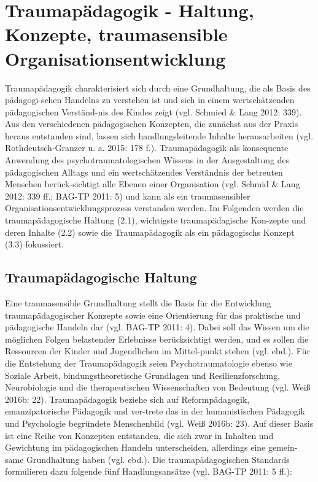 \section{Traumap{\"a}dagogik - Haltung, Konzepte, traumasensible Organisationsentwicklung}

Traumapädagogik charakterisiert sich durch eine Grundhaltung, die als Basis des pädagogi-schen Handelns zu verstehen ist und sich in einem wertschätzenden pädagogischen Verständ-nis des Kindes zeigt (vgl. Schmied \& Lang 2012: 339). Aus den verschiedenen pädagogischen Konzepten, die zunächst aus der Praxis heraus entstanden sind, lassen sich handlungsleitende Inhalte herausarbeiten (vgl. Rothdeutsch-Granzer u. a. 2015: 178 f.). Traumapädagogik als konsequente Anwendung des psychotraumatologischen Wissens in der Ausgestaltung des pädagogischen Alltags und ein wertschätzendes Verständnis der betreuten Menschen berück-sichtigt alle Ebenen einer Organisation (vgl. Schmid \& Lang 2012: 339 ff.; BAG-TP 2011: 5) und kann als ein traumasensibler Organisationsentwicklungsprozess verstanden werden. Im Folgenden werden die traumapädagogische Haltung (2.1), wichtigste traumapädagische Kon-zepte und deren Inhalte (2.2) sowie die Traumap{\"a}dagogik als ein pädagogischs Konzept (3.3) fokussiert.

\subsection{Traumapädagogische Haltung}

Eine traumasensible Grundhaltung stellt die Basis für die Entwicklung traumapädagogischer Konzepte sowie eine Orientierung für das praktische und pädagogische Handeln dar (vgl. BAG-TP 2011: 4). Dabei soll das Wissen um die möglichen Folgen belastender Erlebnisse berücksichtigt werden, und es sollen die Ressourcen der Kinder und Jugendlichen im Mittel-punkt stehen (vgl. ebd.). Für die Entstehung der Traumap{\"a}dagogik seien Psychotraumatologie ebenso wie Soziale Arbeit, bindungstheoretische Grundlagen und Resilienzforschung, Neurobiologie und die therapeutischen Wissenschaften von Bedeutung (vgl. Weiß 2016b: 22). Traumap{\"a}dagogik beziehe sich auf Reformpädagogik, emanzipatorische Pädagogik und ver-trete das in der humanistischen Pädagogik und Psychologie begründete Menschenbild (vgl. Weiß 2016b: 23). Auf dieser Basis ist eine Reihe von Konzepten entstanden, die sich zwar in Inhalten und Gewichtung im pädagogischen Handeln unterscheiden, allerdings eine gemein-same Grundhaltung haben (vgl. ebd.). Die traumapädagogischen Standards formulieren dazu folgende fünf Handlungsansätze (vgl. BAG-TP 2011: 5 ff.):

